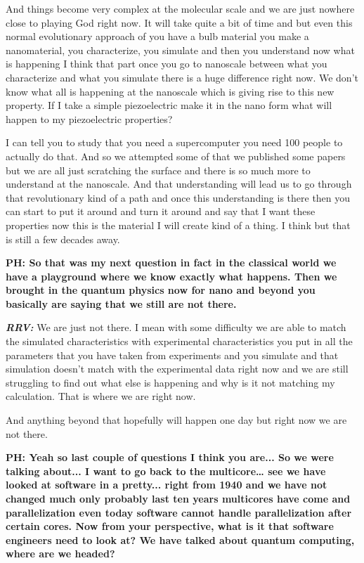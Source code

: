 \begin{multicols}{2}
And things become very complex at the molecular scale and we are just nowhere close to playing God right now. It will take quite a bit of time and but even this normal evolutionary approach of you have a bulb material you make a nanomaterial, you characterize, you simulate and then you understand now what is happening I think that part once you go to nanoscale between what you characterize and what you simulate there is a huge difference right now. We don’t know what all is happening at the nanoscale which is giving rise to this new property. If I take a simple piezoelectric make it in the nano form what will happen to my piezoelectric properties? 

I can tell you to study that you need a supercomputer you need 100 people to actually do that. And so we attempted some of that we published some papers but we are all just scratching the surface and there is so much more to understand at the nanoscale. And that understanding will lead us to go through that revolutionary kind of a path and once this understanding is there then you can start to put it around and turn it around and say that I want these properties now this is the material I will create kind of a thing. I think but that is still a few decades away.


\textbf{PH: So that was my next question in fact in the classical world we have a playground where we know exactly what happens. Then we brought in the quantum physics now for nano and beyond you basically are saying that we still are not there.}

\textbf{\textit{RRV:}} We are just not there. I mean with some difficulty we are able to match the simulated characteristics with experimental characteristics you put in all the parameters that you have taken from experiments and you simulate and that simulation doesn’t match with the experimental data right now and we are still struggling to find out what else is happening and why is it not matching my calculation. That is where we are right now. 

And anything beyond that hopefully will happen one day but right now we are not there. 

\textbf{PH: Yeah so last couple of questions I think you are... So we were talking about... I want to go back to the multicore… see we have looked at software in a pretty... right from 1940 and we have not changed much only probably last ten years multicores have come and parallelization even today software cannot handle parallelization after certain cores. Now from your perspective, what is it that software engineers need to look at? We have talked about quantum computing, where are we headed?}


\end{multicols}
